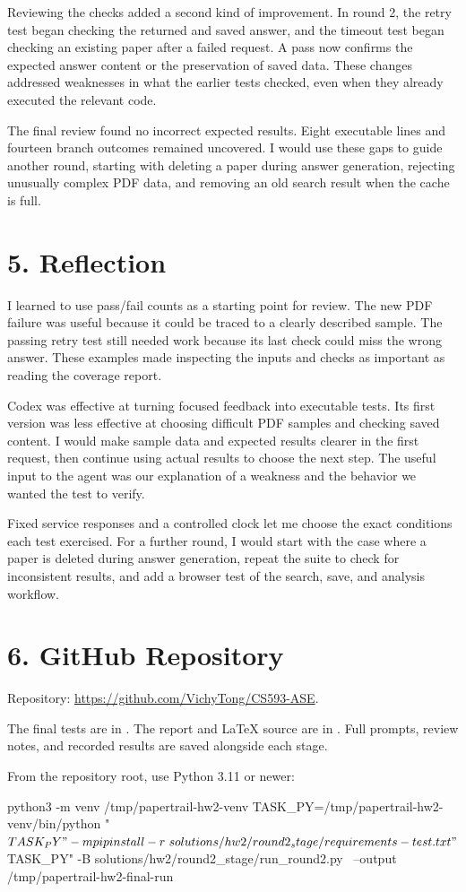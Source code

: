 \documentclass[10pt,letterpaper]{article}
\newcommand{\reportsection}[1]{\section*{\color{black}#1}}
\begin{document}
Reviewing the checks added a second kind of improvement. In round 2, the retry test began checking the returned and saved answer, and the timeout test began checking an existing paper after a failed request. A pass now confirms the expected answer content or the preservation of saved data. These changes addressed weaknesses in what the earlier tests checked, even when they already executed the relevant code.

The final review found no incorrect expected results. Eight executable lines and fourteen branch outcomes remained uncovered. I would use these gaps to guide another round, starting with deleting a paper during answer generation, rejecting unusually complex PDF data, and removing an old search result when the cache is full.

\reportsection{5. Reflection}

I learned to use pass/fail counts as a starting point for review. The new PDF failure was useful because it could be traced to a clearly described sample. The passing retry test still needed work because its last check could miss the wrong answer. These examples made inspecting the inputs and checks as important as reading the coverage report.

Codex was effective at turning focused feedback into executable tests. Its first version was less effective at choosing difficult PDF samples and checking saved content. I would make sample data and expected results clearer in the first request, then continue using actual results to choose the next step. The useful input to the agent was our explanation of a weakness and the behavior we wanted the test to verify.

Fixed service responses and a controlled clock let me choose the exact conditions each test exercised. For a further round, I would start with the case where a paper is deleted during answer generation, repeat the suite to check for inconsistent results, and add a browser test of the search, save, and analysis workflow.

\reportsection{6. GitHub Repository}

Repository: \url{https://github.com/VichyTong/CS593-ASE}.

The final tests are in . The report and LaTeX source are in . Full prompts, review notes, and recorded results are saved alongside each stage.

From the repository root, use Python 3.11 or newer:
\begin{reportcode}
python3 -m venv /tmp/papertrail-hw2-venv
TASK_PY=/tmp/papertrail-hw2-venv/bin/python
"$TASK_PY" -m pip install -r \
  solutions/hw2/round2_stage/requirements-test.txt
"$TASK_PY" -B solutions/hw2/round2_stage/run_round2.py \
  --output /tmp/papertrail-hw2-final-run
\end{reportcode}
\end{document}
